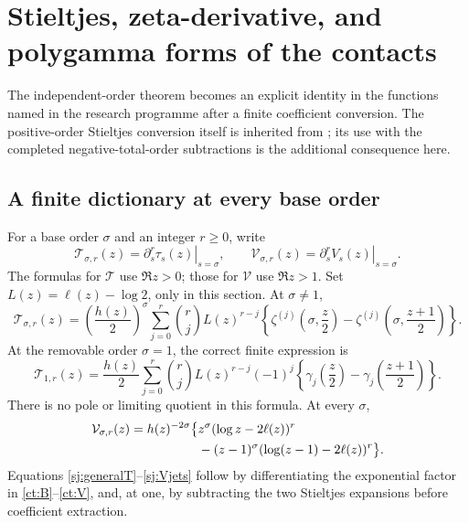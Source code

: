 \documentclass[11pt,letterpaper]{article}
\numberwithin{equation}{section}
\theoremstyle{definition}
\theoremstyle{remark}
\begin{document}
\section{Stieltjes, zeta-derivative, and polygamma forms of the contacts}
\label{sj:section}

The independent-order theorem becomes an explicit identity in the
functions named in the research programme after a finite coefficient
conversion. The positive-order Stieltjes conversion itself is inherited
from \cite{ProveItBilinear}; its use with the completed negative-total-order
subtractions is the additional consequence here.

\subsection{A finite dictionary at every base order}

For a base order \(\sigma\) and an integer \(r\ge0\), write
\[
 \mathcal T_{\sigma,r}(z)
   =\left.\partial_s^r\tau_s(z)\right|_{s=\sigma},
 \qquad
 \mathcal V_{\sigma,r}(z)
   =\left.\partial_s^rV_s(z)\right|_{s=\sigma}.
\]
The formulas for \(\mathcal T\) use \(\Re z>0\); those for
\(\mathcal V\) use \(\Re z>1\).
Set \(L(z)=\ell(z)-\log2\), only in this section. At \(\sigma\ne1\),
\begin{equation}\label{sj:generalT}
 \mathcal T_{\sigma,r}(z)
 =\left(\frac{h(z)}2\right)^\sigma
  \sum_{j=0}^r\binom rj L(z)^{r-j}
  \left\{\zeta^{(j)}\!\left(\sigma,\frac z2\right)
        -\zeta^{(j)}\!\left(\sigma,\frac{z+1}{2}\right)\right\}.
\end{equation}
At the removable order \(\sigma=1\), the correct finite expression is
\begin{equation}\label{sj:stieltjesT}
 \mathcal T_{1,r}(z)=\frac{h(z)}2
  \sum_{j=0}^r\binom rj L(z)^{r-j}(-1)^j
  \left\{\gamma_j\!\left(\frac z2\right)
        -\gamma_j\!\left(\frac{z+1}{2}\right)\right\}.
\end{equation}
There is no pole or limiting quotient in this formula. At every \(\sigma\),
\begin{align}
 \mathcal V_{\sigma,r}(z)
 =h(z)^{-2\sigma}\bigl\{
 &z^\sigma(\log z-2\ell(z))^r \notag\\
 &-(z-1)^\sigma(\log(z-1)-2\ell(z))^r\bigr\}.
 \label{sj:Vjets}
\end{align}
Equations \eqref{sj:generalT}--\eqref{sj:Vjets} follow by differentiating
the exponential factor in \eqref{ct:B}--\eqref{ct:V}, and, at one, by
subtracting the two Stieltjes expansions before coefficient extraction.
\end{document}
